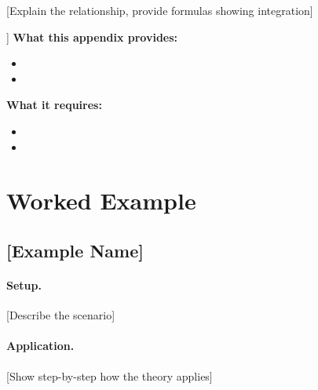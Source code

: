 [Explain the relationship, provide formulas showing integration]

\begin{tcolorbox}[colback=yellow!5!white, colframe=yellow!75!black, 
    title=Integration: This Appendix $\leftrightarrow$ [Related Appendix]]
\textbf{What this appendix provides:}
\begin{itemize}[nosep]
\item [Item 1]
\item [Item 2]
\end{itemize}

\textbf{What it requires:}
\begin{itemize}[nosep]
\item [Item 1]
\item [Item 2]
\end{itemize}
\end{tcolorbox}


%
%

\section{Worked Example}
\label{sec:[code]-example}


\subsection{[Example Name]}

\paragraph{Setup.} [Describe the scenario]

\paragraph{Application.} [Show step-by-step how the theory applies]

